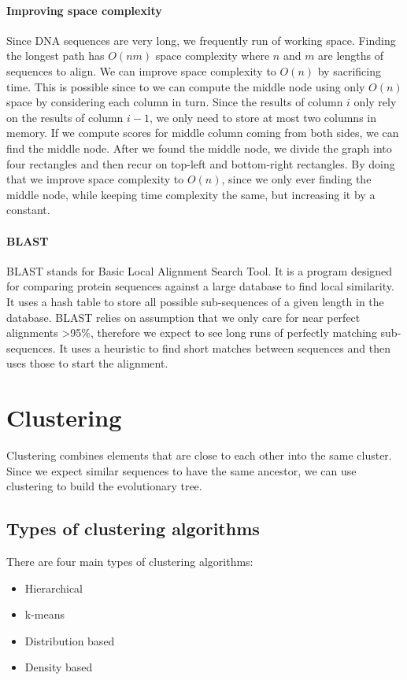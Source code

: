 \documentclass[a5paper]{report}
\begin{document}
\paragraph{Improving space complexity}
Since DNA sequences are very long, we frequently run of working space.
Finding the longest path has $O(nm)$ space complexity where $n$ and $m$ are lengths of sequences to align.
We can improve space complexity to $O(n)$ by sacrificing time.
This is possible since to we can compute the middle node using only $O(n)$ space by considering each column in turn.
Since the results of column $i$ only rely on the results of column $i-1$, we only need to store at most two columns in memory.
If we compute scores for middle column coming from both sides, we can find the middle node.
After we found the middle node, we divide the graph into four rectangles and then recur on top-left and bottom-right rectangles.
By doing that we improve space complexity to $O(n)$, since we only ever finding the middle node, while keeping time complexity the same, but increasing it by a constant.
\paragraph{BLAST}
BLAST stands for Basic Local Alignment Search Tool.
It is a program designed for comparing protein sequences against a large database to find local similarity.
It uses a hash table to store all possible sub-sequences of a given length in the database.
BLAST relies on assumption that we only care for near perfect alignments >95\%, therefore we expect to see long runs of perfectly matching sub-sequences.
It uses a heuristic to find short matches between sequences and then uses those to start the alignment.
\section{Clustering}
Clustering combines elements that are close to each other into the same cluster.
Since we expect similar sequences to have the same ancestor, we can use clustering to build the evolutionary tree.
\subsection{Types of clustering algorithms}
There are four main types of clustering algorithms:
\begin{itemize}
\item Hierarchical
\item k-means
\item Distribution based
\item Density based
\end{itemize}
\end{document}
